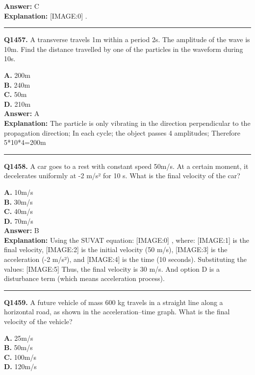 \documentclass[12pt]{article}
\begin{document}
\textbf{Answer:} C \\
\textbf{Explanation:} [IMAGE:0]
.

\hrule
\vspace{1em}


\noindent
\textbf{Q1457.} A transverse travels 1m within a period 2s. The amplitude of the wave is 10m. Find the distance travelled by one of the particles in the waveform during 10s.



\textbf{A.} 200m \\
\textbf{B.} 240m \\
\textbf{C.} 50m \\
\textbf{D.} 210m \\

\textbf{Answer:} A \\
\textbf{Explanation:} The particle is only vibrating in the direction perpendicular to the propagation direction; In each cycle; the object passes 4 amplitudes; Therefore 5*10*4=200m

\hrule
\vspace{1em}


\noindent
\textbf{Q1458.} A car goes to a rest with constant speed 50m/s. At a certain moment, it decelerates uniformly at -2 m/s² for 10 s. What is the final velocity of the car?



\textbf{A.} 10m/s \\
\textbf{B.} 30m/s \\
\textbf{C.} 40m/s \\
\textbf{D.} 70m/s \\

\textbf{Answer:} B \\
\textbf{Explanation:} Using the SUVAT equation:
[IMAGE:0]
, where:
[IMAGE:1]
is the final velocity,
[IMAGE:2]
is the initial velocity (50 m/s),
[IMAGE:3]
is the acceleration (-2 m/s²), and
[IMAGE:4]
is the time (10 seconds).
Substituting the values:
[IMAGE:5]
Thus, the final velocity is 30 m/s. And option D is a disturbance term (which means acceleration process).

\hrule
\vspace{1em}


\noindent
\textbf{Q1459.} A future vehicle of mass 600 kg travels in a straight line along a horizontal road, as shown in the acceleration–time graph.
What is the final velocity of the vehicle?



\textbf{A.} 25m/s \\
\textbf{B.} 50m/s \\
\textbf{C.} 100m/s \\
\textbf{D.} 120m/s \\
\end{document}
